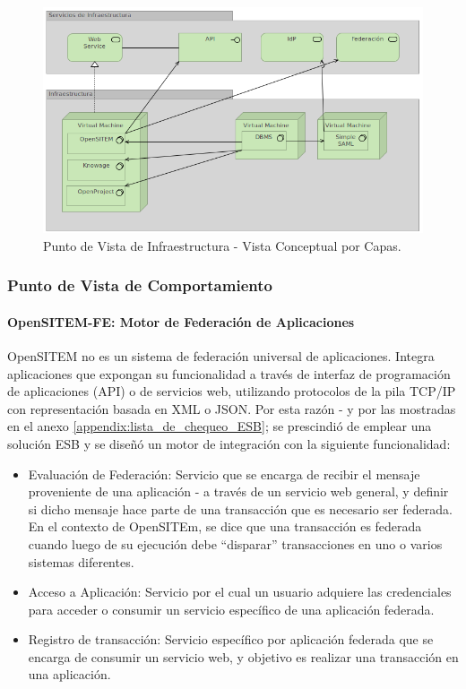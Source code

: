\begin{figure}
 \centering
 \includegraphics[width=120mm]{punto_infraestructura.png}
 \caption{Punto de Vista de Infraestructura - Vista Conceptual por Capas.}
 \label{punto_infraestructura}
\end{figure}


\subsubsection{Punto de Vista de Comportamiento}

\paragraph{OpenSITEM-FE: Motor de Federación de Aplicaciones}

OpenSITEM no es un sistema de federación universal de aplicaciones. Integra aplicaciones que expongan su funcionalidad a través de interfaz de programación de aplicaciones (API) o de servicios web, utilizando protocolos de la pila TCP/IP con representación basada en XML o JSON. Por esta razón - y por las mostradas en el anexo \ref{appendix:lista_de_chequeo_ESB}; se prescindió de emplear una solución ESB y se diseñó un motor de integración con la siguiente funcionalidad:
\begin{itemize}
 \item Evaluación de Federación: Servicio que se encarga de recibir el mensaje proveniente de una aplicación - a través de un servicio web general, y definir si dicho mensaje hace parte de una transacción que es necesario ser federada. En el contexto de OpenSITEm, se dice que una transacción es federada cuando luego de su ejecución debe ``disparar'' transacciones en uno o varios sistemas diferentes.
 \item Acceso a Aplicación: Servicio por el cual un usuario adquiere las credenciales para acceder o consumir un servicio específico de una aplicación federada.
 \item 	Registro de transacción: Servicio específico por aplicación federada que se encarga de consumir un servicio web, y objetivo es realizar una transacción en una aplicación. 
\end{itemize}

